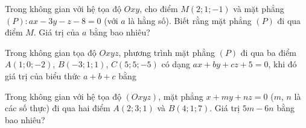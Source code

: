\begin{bt}%
	Trong không gian với hệ tọa độ $Oxy$, cho điểm $M(2;1;-1)$ và mặt phẳng $(P) \colon ax-3y-z-8=0$ (với $a$ là hằng số). Biết rằng  mặt phẳng $(P)$ đi qua điểm $M$. Giá trị của $a$ bằng bao nhiêu?
\end{bt}

\begin{bt}%
	Trong không gian tọa độ $Oxyz$, phương trình mặt phẳng $(P)$ đi qua ba điểm $A(1; 0; -2)$, $B(-3; 1; 1)$, $C(5; 5; -5)$ có dạng $ax + by + cz + 5 = 0$, khi đó giá trị của biểu thức $a + b + c$ bằng 
\end{bt}

\begin{bt}%
	Trong không gian với hệ tọa độ $(Oxyz)$, mặt phẳng $x+my+nz=0$ ($m$, $n$ là các số thực) đi qua hai điểm $A(2;3;1)$ và $B(4;1;7)$. Giá trị $5m-6n$ bằng  bao nhiêu?
\end{bt}

